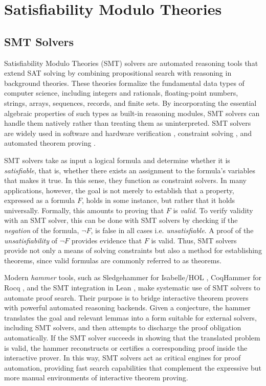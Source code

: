 \chapter{Satisfiability Modulo Theories}\label{ch:smt}


\section{SMT Solvers}

Satisfiability Modulo Theories (SMT) \cite{Barrett2021SatisfiabilityMT} solvers are automated reasoning tools that extend SAT solving \cite{chaff,minitsat} by combining propositional search with reasoning in background theories.
These theories formalize the fundamental data types of computer science, including integers and rationals, floating-point numbers, strings, arrays, sequences, records, and finite sets.
By incorporating the essential algebraic properties of such types as built-in reasoning modules, SMT solvers can handle them natively rather than treating them as uninterpreted.
SMT solvers are widely used in software and hardware verification \cite{application-smt-hardware}, constraint solving \cite{awssmt,application-smt2}, and automated theorem proving \cite{coqhammer1,Sledgehammer}.

SMT solvers take as input a logical formula and determine whether it is \emph{satisfiable}, that is, whether there exists an assignment to the formula's variables that makes it true.
In this sense, they function as constraint solvers.
In many applications, however, the goal is not merely to establish that a property, expressed as a formula $F$, holds in some instance, but rather that it holds universally.
Formally, this amounts to proving that $F$ is \emph{valid}. To verify validity with an SMT solver, this can be done with SMT solvers by checking
if the \emph{negation} of the formula, $\neg F$,  is false in all cases i.e. \emph{unsatisfiable}. A proof of the \emph{unsatisfiability} of $\neg F$ provides evidence that $F$ is valid.
Thus, SMT solvers provide not only a means of solving constraints but also a method for establishing theorems, since valid formulas are commonly referred to as theorems.

Modern \emph{hammer} tools, such as Sledgehammer \cite{Sledgehammer} for Isabelle/HOL \cite{isabelle-hol-ref}, CoqHammer \cite{coqhammer1} for Rocq \cite{Rocq-refman}, and the SMT integration in Lean \cite{lean-smt}, make systematic use of SMT solvers to automate proof search.
Their purpose is to bridge interactive theorem provers with powerful automated reasoning backends.
Given a conjecture, the hammer translates the goal and relevant lemmas into a form suitable for external solvers, including SMT solvers, and then attempts to discharge the proof obligation automatically.
If the SMT solver succeeds in showing that the translated problem is valid, the hammer reconstructs or certifies a corresponding proof inside the interactive prover.
In this way, SMT solvers act as critical engines for proof automation, providing fast search capabilities that complement the expressive but more manual environments of interactive theorem proving.

